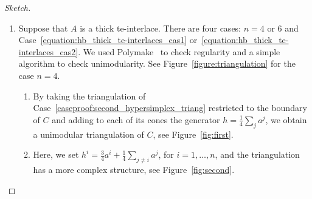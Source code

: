 \documentclass[11pt,a4paper]{amsart}
\theoremstyle{plain}
\newtheorem{claim}[theorem]{Claim}
\theoremstyle{definition}
\newcommand{\cal}[1]{\mathcal{#1}}
\DeclareMathOperator{\conv}{conv}
\DeclareMathOperator{\cone}{cone}
\renewcommand{\cal}[1]{\mathcal{#1}}
\begin{document}
\begin{proof}[Sketch]
\begin{enumerate}[label=\em\arabic*., ref=\arabic*.]
		\begin{claim}
			The cones $C_S=\cone(\frac{1}{2}(a^i+a^j)\colon ij\in E(S))$, for all $S\in \cal S_n$, form a regular unimodular Hilbert triangulation of $C$.
		\end{claim}
		\begin{proof}[Sketch]
			These cones are all Hilbert.
			Up to a linear transformation by $(2A^{-1})^\top$, it is the regular triangulation of the second hypersimplex given in~\cite{DeLoera_Sturmfels_Thomas_1995} to which we attach the simplex composed of $2e^i$ and the simplicial facet $\{x_i=1\}$, for $i=1,\ldots,n$.
			Attaching these simplices preserves regularity and determinant computations yield unimodularity.
			\end{proof}
		\item Suppose that $A$ is a thick te-interlace.
		There are four cases: $n=4$ or $6$ and Case~\ref{equation:hb_thick_te-interlaces_cas1} or~\ref{equation:hb_thick_te-interlaces_cas2}.
		We used Polymake~\cite{Gawrilow_Joswig_2000} to check regularity and a simple algorithm to check unimodularity. See Figure~\ref{figure:triangulation} for the case $n=4$.
		\begin{enumerate}[label=\em\alph*., ref=\theenumi.\alph*.]
			\item  By taking the triangulation of Case~\ref{caseproof:second_hypersimplex_triang} restricted to the boundary of $C$ and adding to each of its cones the generator $h=\frac{1}{4}\sum_j a^j$, we obtain a unimodular triangulation of $C$, see Figure~\ref{fig:first}.
			\item Here, we set $h^i = \frac{3}{4}a^i+\frac{1}{4}\sum_{j\neq i} a^j$, for $i=1,\ldots,n$, and the triangulation has a more complex structure, see Figure~\ref{fig:second}.
		\end{enumerate}
	\end{enumerate}
	

\end{proof}
\end{document}
